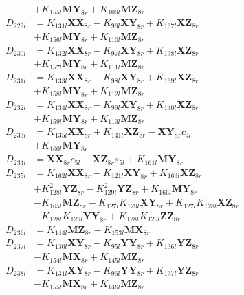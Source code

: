 \begin{multicols}{2}
\begin{align}
&+ K_{155l}\mathbf{MY}_{8r} + K_{109l}\mathbf{MZ}_{8r} \nonumber \\
D_{229l} &= K_{131l}\mathbf{XX}_{8r} - K_{96l}\mathbf{XY}_{8r} + K_{137l}\mathbf{XZ}_{8r}  \nonumber \\
&+ K_{156l}\mathbf{MY}_{8r} + K_{110l}\mathbf{MZ}_{8r} \nonumber \\
D_{230l} &= K_{132l}\mathbf{XX}_{8r} - K_{97l}\mathbf{XY}_{8r} + K_{138l}\mathbf{XZ}_{8r}  \nonumber \\
&+ K_{157l}\mathbf{MY}_{8r} + K_{111l}\mathbf{MZ}_{8r} \nonumber \\
D_{231l} &= K_{133l}\mathbf{XX}_{8r} - K_{98l}\mathbf{XY}_{8r} + K_{139l}\mathbf{XZ}_{8r}  \nonumber \\
&+ K_{158l}\mathbf{MY}_{8r} + K_{112l}\mathbf{MZ}_{8r} \nonumber \\
D_{232l} &= K_{134l}\mathbf{XX}_{8r} - K_{99l}\mathbf{XY}_{8r} + K_{140l}\mathbf{XZ}_{8r}  \nonumber \\
&+ K_{159l}\mathbf{MY}_{8r} + K_{113l}\mathbf{MZ}_{8r} \nonumber \\
D_{233l} &= K_{135l}\mathbf{XX}_{8r} + K_{141l}\mathbf{XZ}_{8r} - \mathbf{XY}_{8r}c_{4l}  \nonumber \\
&+ K_{160l}\mathbf{MY}_{8r} \nonumber \\
D_{234l} &= \mathbf{XX}_{8r}c_{5l} - \mathbf{XZ}_{8r}s_{5l} + K_{161l}\mathbf{MY}_{8r} \nonumber \\
D_{235l} &= K_{162l}\mathbf{XX}_{8r} - K_{121l}\mathbf{XY}_{8r} + K_{163l}\mathbf{XZ}_{8r}  \nonumber \\
&+ K_{128l}^2\mathbf{YZ}_{8r} - K_{129l}^2\mathbf{YZ}_{8r} + K_{166l}\mathbf{MY}_{8r}  \nonumber \\
&- K_{165l}\mathbf{MZ}_{8r} - K_{127l}K_{129l}\mathbf{XY}_{8r} + K_{127l}K_{128l}\mathbf{XZ}_{8r}  \nonumber \\
&- K_{128l}K_{129l}\mathbf{YY}_{8r} + K_{128l}K_{129l}\mathbf{ZZ}_{8r} \nonumber \\
D_{236l} &= K_{144l}\mathbf{MZ}_{8r} - K_{153l}\mathbf{MX}_{8r} \nonumber \\
D_{237l} &= K_{130l}\mathbf{XY}_{8r} - K_{95l}\mathbf{YY}_{8r} + K_{136l}\mathbf{YZ}_{8r}  \nonumber \\
&- K_{154l}\mathbf{MX}_{8r} + K_{145l}\mathbf{MZ}_{8r} \nonumber \\
D_{238l} &= K_{131l}\mathbf{XY}_{8r} - K_{96l}\mathbf{YY}_{8r} + K_{137l}\mathbf{YZ}_{8r}  \nonumber \\
&- K_{155l}\mathbf{MX}_{8r} + K_{146l}\mathbf{MZ}_{8r} \nonumber \\

\end{align}
\end{multicols}
